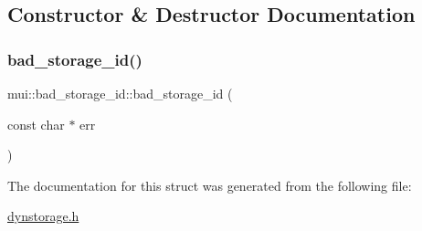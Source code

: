 \subsection{Constructor \& Destructor Documentation}
\mbox{\label{structmui_1_1bad__storage__id_a5daf39721cbd9687cf9351d609386f9c}} 
\subsubsection{\texorpdfstring{bad\+\_\+storage\+\_\+id()}{bad\_storage\_id()}}
{\footnotesize\ttfamily mui\+::bad\+\_\+storage\+\_\+id\+::bad\+\_\+storage\+\_\+id (\begin{DoxyParamCaption}\item[{const char $\ast$}]{err }\end{DoxyParamCaption})\hspace{0.3cm}{\ttfamily [inline]}}



The documentation for this struct was generated from the following file\+:\begin{DoxyCompactItemize}
\item 
\hyperlink{dynstorage_8h}{dynstorage.\+h}\end{DoxyCompactItemize}

